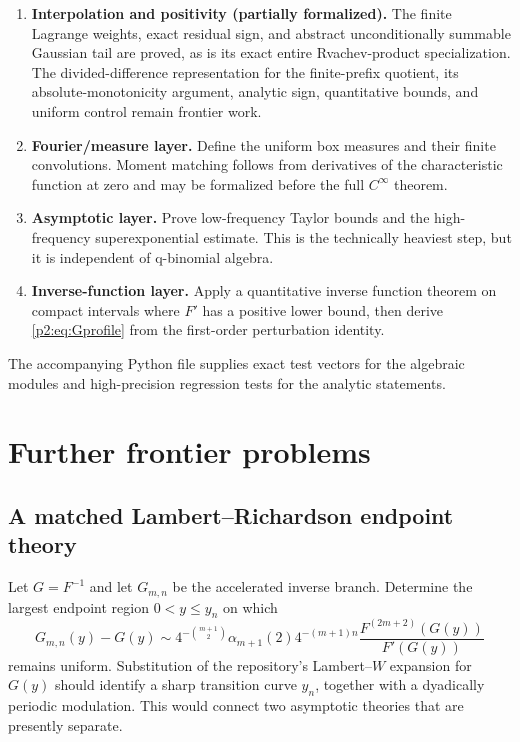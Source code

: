\documentclass[11pt,oneside]{article}
\numberwithin{equation}{section}
\theoremstyle{definition}
\theoremstyle{remark}
\begin{document}
\begin{enumerate}[label=\arabic*.,leftmargin=9mm]
\item \textbf{Interpolation and positivity (partially formalized).}  The
finite Lagrange weights, exact residual sign, and abstract unconditionally
summable Gaussian tail are proved, as is its exact entire Rvachev-product
specialization.  The divided-difference representation for the finite-prefix
quotient, its absolute-monotonicity argument, analytic sign, quantitative
bounds, and uniform control remain frontier work.

\item \textbf{Fourier/measure layer.} Define the uniform box measures and their
finite convolutions. Moment matching follows from derivatives of the
characteristic function at zero and may be formalized before the full
\(C^\infty\) theorem.

\item \textbf{Asymptotic layer.} Prove low-frequency Taylor bounds and the
high-frequency superexponential estimate. This is the technically heaviest step,
but it is independent of q-binomial algebra.

\item \textbf{Inverse-function layer.} Apply a quantitative inverse function
theorem on compact intervals where \(F'\) has a positive lower bound, then derive
\eqref{p2:eq:Gprofile} from the first-order perturbation identity.
\end{enumerate}

The accompanying Python file supplies exact test vectors for the algebraic
modules and high-precision regression tests for the analytic statements.

\section{Further frontier problems}
\label{p2:sec:open}

\subsection{A matched Lambert--Richardson endpoint theory}

Let \(G=F^{-1}\) and let \(G_{m,n}\) be the accelerated inverse branch. Determine
the largest endpoint region \(0<y\leq y_n\) on which
\[
 G_{m,n}(y)-G(y)
 \sim 4^{-\binom{m+1}{2}}\alpha_{m+1}(2)4^{-(m+1)n}
 \frac{F^{(2m+2)}(G(y))}{F'(G(y))}
\]
remains uniform. Substitution of the repository's Lambert--\(W\) expansion for
\(G(y)\) should identify a sharp transition curve \(y_n\), together with a
dyadically periodic modulation. This would connect two asymptotic theories that
are presently separate.
\end{document}
